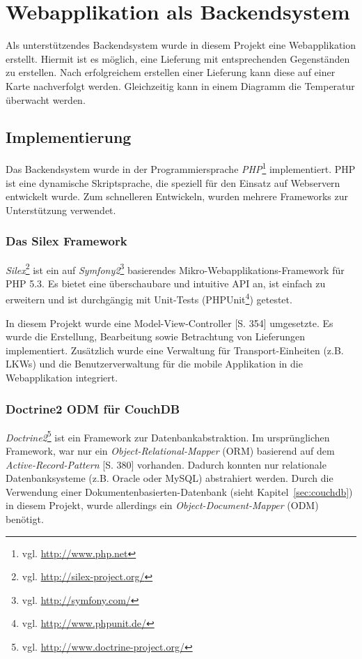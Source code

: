 \section{Webapplikation als Backendsystem}
\label{sec:webapplication}

Als unterstützendes Backendsystem wurde in diesem Projekt eine Webapplikation
	erstellt. Hiermit ist es möglich, eine Lieferung mit entsprechenden
	Gegenständen zu erstellen. Nach erfolgreichem erstellen einer Lieferung
	kann diese auf einer Karte nachverfolgt werden. Gleichzeitig kann in
	einem Diagramm die Temperatur überwacht werden.

\subsection{Implementierung}

Das Backendsystem wurde in der Programmiersprache \emph{PHP}\footnote{vgl.
	\url{http://www.php.net}} implementiert. PHP ist eine dynamische
	Skriptsprache, die speziell für den Einsatz auf Webservern entwickelt
	wurde. Zum schnelleren Entwickeln, wurden mehrere Frameworks zur
	Unterstützung verwendet.
	
\subsubsection{Das Silex Framework}
\emph{Silex}\footnote{vgl. \url{http://silex-project.org/}} ist ein auf
	\emph{Symfony2}\footnote{vgl. \url{http://symfony.com/}} basierendes
	Mikro-Webapplikations-Framework für PHP 5.3. Es bietet eine überschaubare
	und intuitive API an, ist einfach zu erweitern und ist durchgängig mit
	Unit-Tests (PHPUnit\footnote{vgl. \url{http://www.phpunit.de/}}) getestet.
	
In diesem Projekt wurde eine Model-View-Controller \cite{Schmidt09}[S. 354]
	umgesetzte. Es wurde die Erstellung, Bearbeitung sowie Betrachtung von
	Lieferungen implementiert. Zusätzlich wurde eine Verwaltung für
	Transport-Einheiten (z.B. LKWs) und die Benutzerverwaltung für die mobile
	Applikation	in die Webapplikation integriert.
		
\subsubsection{Doctrine2 ODM für CouchDB}
\emph{Doctrine2}\footnote{vgl. \url{http://www.doctrine-project.org/}} ist ein
	Framework zur Datenbankabstraktion. Im ursprünglichen Framework, war nur ein
	\emph{Object-Relational-Mapper} (ORM) basierend auf dem
	\emph{Active-Record-Pattern} \cite{Schmidt09}[S. 380] vorhanden. Dadurch
	konnten nur relationale	Datenbanksysteme (z.B. Oracle oder MySQL) abstrahiert
	werden. Durch die Verwendung einer Dokumentenbasierten-Datenbank (sieht
	Kapitel~\ref{sec:couchdb}) in diesem Projekt, wurde allerdings ein
	\emph{Object-Document-Mapper} (ODM) benötigt.
	
